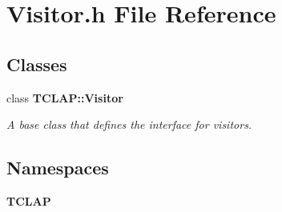 \section{Visitor.\+h File Reference}
\label{Visitor_8h}
\subsection*{Classes}
\begin{DoxyCompactItemize}
\item 
class {\bf T\+C\+L\+A\+P\+::\+Visitor}
\begin{DoxyCompactList}\small\item\em A base class that defines the interface for visitors. \end{DoxyCompactList}\end{DoxyCompactItemize}
\subsection*{Namespaces}
\begin{DoxyCompactItemize}
\item 
 {\bf T\+C\+L\+A\+P}
\end{DoxyCompactItemize}
